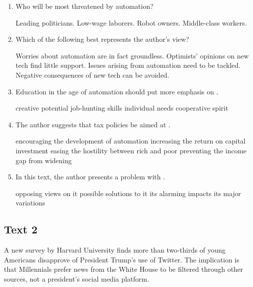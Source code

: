 \begin{enumerate}[resume]
	\item
Who will be most threatened by automation?


\fourchoices
{Leading politicians.}
{Low-wage laborers.}
{Robot owners.}
{Middle-class workers.}


\item
Which of the following best represents the author's view?


\fourchoices
{Worries about automation are in fact groundless.}
{Optimists' opinions on new tech find little support.}
{Issues arising from automation need to be tackled.}
{Negative consequences of new tech can be avoided.}


\item
Education in the age of automation should put more emphasis on \lineread.


\fourchoices
{creative potential}
{job-hunting skills}
{individual needs}
{cooperative spirit}


\item
The author suggests that tax policies be aimed at \lineread.


\fourchoices
{encouraging the development of automation}
{increasing the return on capital investment}
{easing the hostility between rich and poor}
{preventing the income gap from widening}

\item
In this text, the author presents a problem with \lineread.


\fourchoices
{opposing views on it}
{possible solutions to it}
{its alarming impacts}
{its major variations}

\end{enumerate}


\newpage
\subsection{Text 2}


A new survey by Harvard University finds more than two-thirds of young
Americans disapprove of President Trump's use of Twitter. The
implication is that Millennials prefer news from the White House to be
filtered through other sources, not a president's social media platform.


